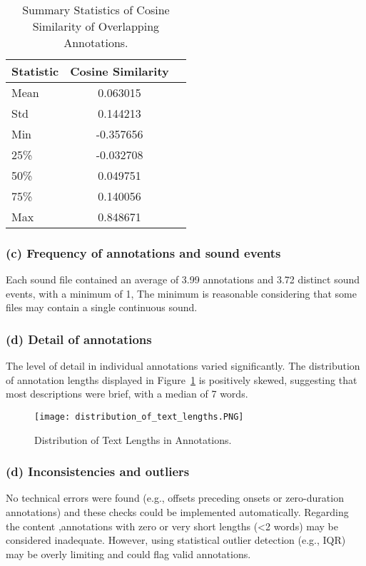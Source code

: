 \documentclass{article}
\begin{document}
\begin{table}[h]
    \caption{Summary Statistics of Cosine Similarity of Overlapping Annotations.}
    \label{tab:cos}
    \centering
    \begin{tabular}{lcl}
        \toprule
        Statistic & Cosine Similarity \\ \midrule
        Mean            & 0.063015 \\
        Std             & 0.144213 \\
        Min             & -0.357656 \\
        25\%            & -0.032708 \\
        50\%            & 0.049751 \\
        75\%            & 0.140056 \\ 
        Max             & 0.848671 \\ \bottomrule
    \end{tabular}
\end{table}

\subsubsection{(c) Frequency of annotations and sound events}
Each sound file contained an average of 3.99 annotations and 3.72 distinct sound events, with a minimum of 1, The minimum is reasonable considering that some files may contain a single continuous sound.

\subsubsection{(d) Detail of annotations}
The level of detail in individual annotations varied significantly. The distribution of annotation lengths displayed in Figure~\ref{fig:len} is positively skewed, suggesting that most descriptions were brief, with a median of 7 words.

\begin{figure}[h]
    \centering
    \texttt{[image: distribution\_of\_text\_lengths.PNG]}
    \caption{Distribution of Text Lengths in Annotations.}
    \label{fig:len}
\end{figure}

\subsubsection{(d) Inconsistencies and outliers}
No technical errors were found (e.g., offsets preceding onsets or zero-duration annotations) and these checks could be implemented automatically.
Regarding the content ,annotations with zero or very short lengths (<2 words) may be considered inadequate. However, using statistical outlier detection (e.g., IQR) may be overly limiting and could flag valid annotations.


\end{document}
